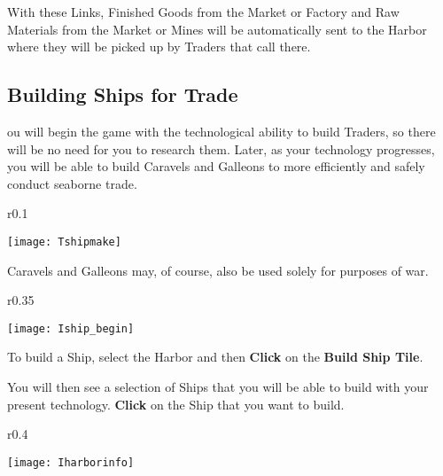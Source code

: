 With these Links, Finished Goods from the Market or Factory and Raw Materials from the Market or Mines will be automatically sent to the Harbor where they will be picked up by Traders that call there.

\subsection{{Building Ships for Trade}}


ou will begin the game with the technological ability to build Traders, so there will be no need for you to research them. Later, as your technology progresses, you will be able to build Caravels and Galleons to more efficiently and safely conduct seaborne trade.

\begin{wrapfigure}{r}{0.1\textwidth}
    \vspace{-20pt}
    \begin{center}
        \texttt{[image: Tshipmake]}
    \end{center}
    \vspace{-20pt}
\end{wrapfigure}

Caravels and Galleons may, of course, also be used solely for purposes of war.

\begin{wrapfigure}{r}{0.35\textwidth}
	\vspace{-20pt}
	\begin{center}
		\texttt{[image: Iship\_begin]} %
	\end{center}
	\vspace{-20pt}
\end{wrapfigure}

To build a Ship, select the Harbor and then \textbf{Click} on the \textbf{Build Ship Tile}.

You will then see a selection of Ships that you will be able to build with your present technology. \textbf{Click} on the Ship that you want to build.

\begin{wrapfigure}{r}{0.4\textwidth}
	\vspace{-20pt}
	\begin{center}
		\texttt{[image: Iharborinfo]} %
	\end{center}
	\vspace{-20pt}
\end{wrapfigure}

